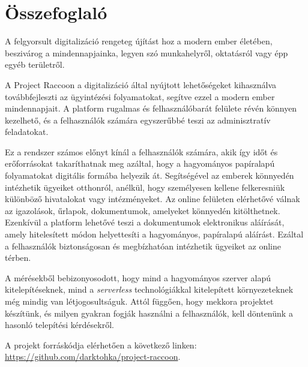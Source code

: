 \chapter*{Összefoglaló}

A felgyorsult digitalizáció rengeteg újítást hoz a modern ember életében, beszivárog a mindennapjainka, legyen szó munkahelyről, oktatásról vagy épp egyéb területről. 

A Project Raccoon a digitalizáció által nyújtott lehetőségeket kihasználva továbbfejleszti az ügyintézési folyamatokat, segítve ezzel a modern ember mindennapjait. A platform rugalmas és felhasználóbarát felülete révén könnyen kezelhető, és a felhasználók számára egyszerűbbé teszi az adminisztratív feladatokat.

Ez a rendszer számos előnyt kínál a felhasználók számára, akik így időt és erőforrásokat takaríthatnak meg azáltal, hogy a hagyományos papíralapú folyamatokat digitális formába helyezik át. Segítségével az emberek könnyedén intézhetik ügyeiket otthonról, anélkül, hogy személyesen kellene felkeresniük különböző hivatalokat vagy intézményeket. Az online felületen elérhetővé válnak az igazolások, űrlapok, dokumentumok, amelyeket könnyedén kitölthetnek. Ezenkívül a platform lehetővé teszi a dokumentumok elektronikus aláírását, amely hitelesített módon helyettesíti a hagyományos, papíralapú aláírást. Ezáltal a felhasználók biztonságosan és megbízhatóan intézhetik ügyeiket az online térben.

A mérésekből bebizonyosodott, hogy mind a hagyományos szerver alapú kitelepítéseknek, mind a \textit{serverless} technológiákkal kitelepített környezeteknek még mindig van létjogosultságuk. Attól függően, hogy mekkora projektet készítünk, és milyen gyakran fogják használni a felhasználók, kell döntenünk a hasonló telepítési kérdésekről.


A projekt forráskódja elérhetően a következő linken: \url{https://github.com/darktohka/project-raccoon}.